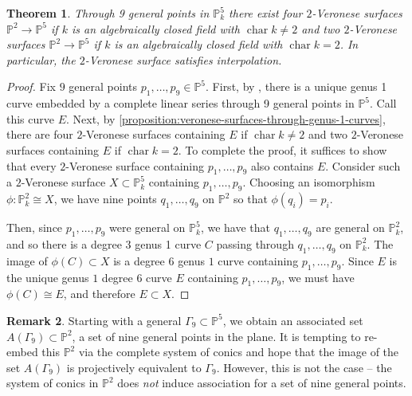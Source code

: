 \documentclass[reqno, 11pt]{amsart}
\theoremstyle{definition}
\theoremstyle{remark}
\numberwithin{equation}{section}
\numberwithin{thm}{section}
\numberwithin{prop}{section}
\numberwithin{lem}{section}
\numberwithin{cor}{section}
\numberwithin{conj}{section}
\numberwithin{defn}{section}
\DeclareMathOperator\ch{char}
\theoremstyle{plain}
\newtheorem{theorem}{Theorem}[section]
\theoremstyle{definition}
\newtheorem{remark}[theorem]{Remark}
\newcommand\bp{{\mathbb P}}
\newcommand \ra{\rightarrow}
\begin{document}
\begin{theorem}
  \label{theorem:counting-veronese-interpolation}
  Through 9 general points in $\bp^5_k$ there exist four
  $2$-Veronese surfaces $\bp^2 \ra \bp^5$ if $k$
  is an algebraically closed field with $\ch k \neq 2$
  and two $2$-Veronese surfaces $\bp^2 \ra \bp^5$
  if $k$ is an algebraically closed field with $\ch k = 2$.
  In particular, the $2$-Veronese surface satisfies interpolation.
\end{theorem}
\begin{proof}
  Fix $9$ general points $p_1, \ldots, p_9 \in \bp^5$.
  First, by \cite[Theorem 5.2]{dolgachev:on-certain-families-of-elliptic-curves-in-projective-space}, there is a unique genus 1 curve embedded by
  a complete linear series through 9 general points in $\bp^5$.
  Call this curve $E$.
  Next, by \autoref{proposition:veronese-surfaces-through-genus-1-curves},
  there are four $2$-Veronese surfaces containing $E$
  if $\ch k \neq 2$ and two $2$-Veronese surfaces containing $E$
  if $\ch k = 2$.
  To complete the proof, 
  it suffices to show that every $2$-Veronese surface containing
  $p_1, \ldots, p_9$
  also contains $E$.
  Consider such a $2$-Veronese surface $X \subset \bp^5_k$ containing
  $p_1, \ldots, p_9$.
  Choosing an isomorphism $\phi: \bp^2_k \cong X$,
  we have nine points $q_1, \ldots, q_9$ on $\bp^2$
  so that $\phi(q_i) = p_i$.

  Then, since $p_1, \ldots, p_9$ were general on $\bp^5_k$,
  we have that $q_1, \ldots, q_9$ are general on $\bp^2_k$,
  and so there is a degree $3$ genus 1 curve $C$ passing through
  $q_1, \ldots, q_9$ on $\bp^2_k$.
  The image of $\phi(C)\subset X$ is a degree $6$ genus $1$ curve
  containing $p_1, \ldots, p_9$.
  Since $E$ is the unique genus $1$ degree $6$ curve $E$ containing
  $p_1, \ldots, p_9$, we must have $\phi(C) \cong E$,
  and therefore $E \subset X$.
\end{proof}

\begin{remark}
Starting with a general $\Gamma_{9} \subset \bp^{5}$, we obtain
an associated set $A(\Gamma_{9}) \subset \bp^{2}$, a set of nine general points in the plane. It is tempting to re-embed this $\bp^{2}$ via the complete system of conics and hope that the image of the set $A(\Gamma_{9})$ is projectively equivalent to $\Gamma_{9}$.  However, this is not the case -- the system of conics in $\bp^{2}$ does {\sl not} induce association for a set of nine general points.
\end{remark} 
\end{document}
